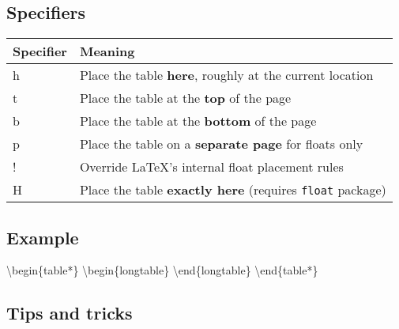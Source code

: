 \documentclass[
  letterpaper,
  DIV=11,
  numbers=noendperiod]{scrreprt}
\newenvironment{Shaded}{\begin{snugshade}}{\end{snugshade}}
\newcommand{\NormalTok}[1]{\textcolor[rgb]{0.00,0.23,0.31}{#1}}
\begin{document}
\subsection*{Specifiers}\label{specifiers}

\begin{longtable}[]{@{}
  >{\raggedright\arraybackslash}p{}
  >{\raggedright\arraybackslash}p{}@{}}
\toprule\noalign{}
\begin{minipage}[b]{\linewidth}\raggedright
Specifier
\end{minipage} & \begin{minipage}[b]{\linewidth}\raggedright
Meaning
\end{minipage} \\
\midrule\noalign{}
\endhead
\bottomrule\noalign{}
\endlastfoot
h & Place the table \textbf{here}, roughly at the current location \\
t & Place the table at the \textbf{top} of the page \\
b & Place the table at the \textbf{bottom} of the page \\
p & Place the table on a \textbf{separate page} for floats only \\
! & Override LaTeX's internal float placement rules \\
H & Place the table \textbf{exactly here} (requires \texttt{float}
package) \\
\end{longtable}

\subsection*{Example}\label{example}

\begin{Shaded}
\begin{Highlighting}[]
\NormalTok{\textbackslash{}begin\{table*\}}
\NormalTok{  \textbackslash{}begin\{longtable\}}
\NormalTok{  \textbackslash{}end\{longtable\}}
\NormalTok{\textbackslash{}end\{table*\}}
\end{Highlighting}
\end{Shaded}

\subsection*{Tips and tricks}\label{tips-and-tricks}
\end{document}
